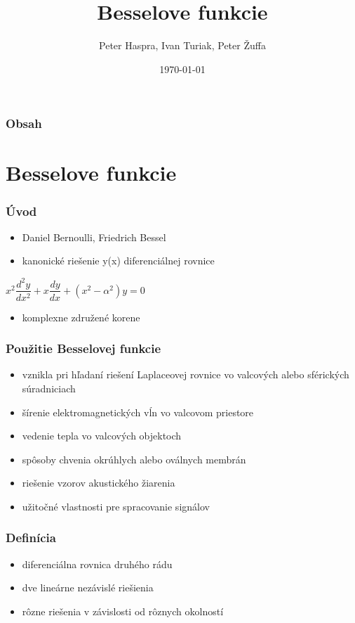\documentclass{beamer}
\begin{document}
\title{Besselove funkcie}  
\author{Peter Haspra, Ivan Turiak, Peter Žuffa}
\date{\today} 

\begin{frame}
\titlepage
\end{frame}

\begin{frame}\frametitle{Obsah}\tableofcontents
\end{frame} 

\section{Besselove funkcie} 

\begin{frame}\frametitle{Úvod}

\begin{itemize}
\item Daniel Bernoulli, Friedrich Bessel
\item kanonické riešenie y(x) diferenciálnej rovnice
\end{itemize}
\begin{center}
$x^2\dfrac{d^2y}{dx^2}+x\dfrac{dy}{dx}+(x^2-\alpha^2)y=0$
\end{center}

\begin{itemize}
\item komplexne združené korene
\end{itemize}
\end{frame} 

\begin{frame}
\frametitle{Použitie Besselovej funkcie}
\begin{itemize}
\item vznikla pri hľadaní riešení Laplaceovej rovnice vo valcových alebo sférických súradniciach
\item šírenie elektromagnetických vĺn vo valcovom priestore
\item vedenie tepla vo valcových objektoch
\item spôsoby chvenia okrúhlych alebo oválnych membrán
\item riešenie vzorov akustického žiarenia
\item užitočné vlastnosti pre spracovanie signálov
\end{itemize}
\end{frame}

\begin{frame}
\frametitle{Definícia}
\begin{itemize}
\item diferenciálna rovnica druhého rádu
\item dve lineárne nezávislé riešienia
\item rôzne riešenia v závislosti od rôznych okolností
\end{itemize}

\end{frame}
\end{document}

